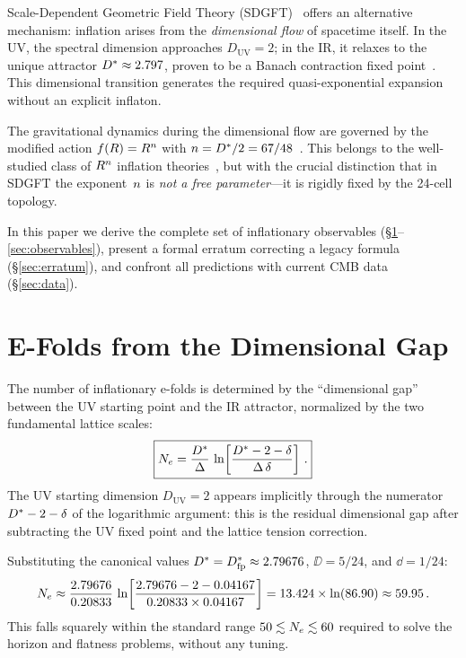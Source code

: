 \documentclass[a4paper,11pt]{article}
\begin{document}
Scale-Dependent Geometric Field Theory
(SDGFT)~\cite{Goldstein_Paper01,Goldstein_Paper04} offers an
alternative mechanism: inflation arises from the \emph{dimensional
flow} of spacetime itself.  In the UV, the spectral dimension
approaches $D_{\mathrm{UV}} = 2$; in the IR, it relaxes to the
unique attractor $D^{*} \approx 2.797$, proven to be a Banach
contraction fixed point~\cite{Goldstein_Paper04}.  This
dimensional transition generates the required quasi-exponential
expansion without an explicit inflaton.

The gravitational dynamics during the dimensional flow are governed
by the modified action $f(R) = R^n$ with $n = D^{*}/2 =
67/48$~\cite{Goldstein_Paper14}.  This belongs to the well-studied
class of $R^n$ inflation theories~\cite{Muller1990,Hwang2001,
Amendola2007}, but with the crucial distinction that in SDGFT the
exponent~$n$ is \emph{not a free parameter}---it is rigidly
fixed by the 24-cell topology.

In this paper we derive the complete set of inflationary observables
(\S\ref{sec:efolding}--\ref{sec:observables}), present a formal
erratum correcting a legacy formula (\S\ref{sec:erratum}), and
confront all predictions with current CMB data (\S\ref{sec:data}).

\section{E-Folds from the Dimensional Gap}
\label{sec:efolding}

The number of inflationary e-folds is determined by the ``dimensional
gap'' between the UV starting point and the IR attractor, normalized
by the two fundamental lattice scales:
\begin{equation}
  \boxed{%
    \Ne = \frac{\Dstar}{\DD}\,
          \ln\!\left[\frac{\Dstar - 2 - \dd}{\DD\,\dd}\right]\,.
  }
  \label{eq:Ne}
\end{equation}
The UV starting dimension $D_{\mathrm{UV}} = 2$ appears implicitly
through the numerator $D^{*} - 2 - \delta$ of the logarithmic
argument: this is the residual dimensional gap after subtracting
the UV fixed point and the lattice tension correction.

Substituting the canonical values $D^{*} = D^{*}_{\mathrm{fp}} \approx
2.79676$, $\DD = 5/24$, and $\dd = 1/24$:
\begin{equation}
  N_e \approx \frac{2.79676}{0.20833}\,
       \ln\!\left[\frac{2.79676 - 2 - 0.04167}{0.20833 \times
       0.04167}\right]
     = 13.424 \times \ln(86.90)
     \approx 59.95\,.
  \label{eq:Ne_numerical}
\end{equation}
This falls squarely within the standard range $50 \lesssim N_e
\lesssim 60$ required to solve the horizon and flatness problems,
without any tuning.
\end{document}
